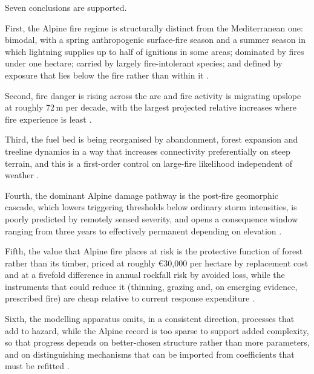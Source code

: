 \documentclass[11pt,a4paper]{article}
\begin{document}
Seven conclusions are supported.

First, the Alpine fire regime is structurally distinct from the Mediterranean one: bimodal, with a spring anthropogenic surface-fire season and a summer season in which lightning supplies up to half of ignitions in some areas; dominated by fires under one hectare; carried by largely fire-intolerant species; and defined by exposure that lies below the fire rather than within it \citep{muller_forest_2020, valese_wildfires_2011, bercak_combination_2024, mutterer_bark_2026}.

Second, fire danger is rising across the arc and fire activity is migrating upslope at roughly 72\,m per decade, with the largest projected relative increases where fire experience is least \citep{beloiu_climatedriven_2026, gerberding_mapping_2025, miller_climate_2024}.

Third, the fuel bed is being reorganised by abandonment, forest expansion and treeline dynamics in a way that increases connectivity preferentially on steep terrain, and this is a first-order control on large-fire likelihood independent of weather \citep{frei_evidence_2023, stritih_alternative_2023, conedera_linking_2024}.

Fourth, the dominant Alpine damage pathway is the post-fire geomorphic cascade, which lowers triggering thresholds below ordinary storm intensities, is poorly predicted by remotely sensed severity, and opens a consequence window ranging from three years to effectively permanent depending on elevation \citep{laporta_postwildfire_2025, negri_wildfire_2026, degiuli_arrested_2024, moos_climate_2021}.

Fifth, the value that Alpine fire places at risk is the protective function of forest rather than its timber, priced at roughly €30{,}000 per hectare by replacement cost and at a fivefold difference in annual rockfall risk by avoided loss, while the instruments that could reduce it (thinning, grazing and, on emerging evidence, prescribed fire) are cheap relative to current response expenditure \citep{accastello_asforesee_2019, moos_climate_2021, muller_forest_2020, gamba_prescribed_2025}.

Sixth, the modelling apparatus omits, in a consistent direction, processes that add to hazard, while the Alpine record is too sparse to support added complexity, so that progress depends on better-chosen structure rather than more parameters, and on distinguishing mechanisms that can be imported from coefficients that must be refitted \citep{conedera_linking_2024, de_angelis_modelling_2015, diakakis_exploring_2023, cardil_assessing_2025}.
\end{document}
